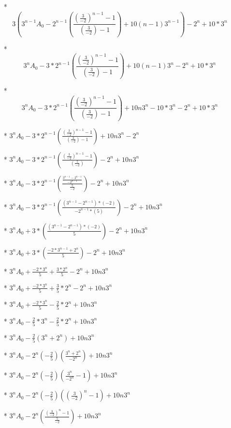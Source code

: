 \documentclass{article}
\begin{document}
\begin{enumerate}
\begin{enumerate}
\begin{itemize}
\begin{itemize}
      \item [*] $$3\left(3^{n-1}A_{0}-2^{n-1}\left(\frac{\left(\frac{3}{-2}\right)^{n-1}-1}{\left(\frac{3}{-2}\right)-1}\right)+10(n-1)3^{n-1}\right)-2^{n}+10*3^{n}$$
      \item [*] $$3^{n}A_{0}-3*2^{n-1}\left(\frac{\left(\frac{3}{-2}\right)^{n-1}-1}{\left(\frac{3}{-2}\right)-1}\right)+10(n-1)3^{n}-2^{n}+10*3^{n}$$
      \item [*] $$3^{n}A_{0}-3*2^{n-1}\left(\frac{\left(\frac{3}{-2}\right)^{n-1}-1}{\left(\frac{3}{-2}\right)-1}\right)+10n3^{n}-10*3^{n}-2^{n}+10*3^{n}$$
      \item [*] $3^{n}A_{0}-3*2^{n-1}\left(\frac{\left(\frac{3}{-2}\right)^{n-1}-1}{\left(\frac{3}{-2}\right)-1}\right)+10n3^{n}-2^{n}$
      \item [*] $3^{n}A_{0} -3*2^{n-1}\left(\frac{(\frac{3}{-2})^{n-1}-1}{(\frac{5}{-2})}\right)-2^{n}+10n3^{n}$
      \item [*] $3^{n}A_{0} -3*2^{n-1}\left(\frac{\frac{3^{n-1}-2^{n-1}}{-2^{n-1} }}{\frac{5}{-2}}\right)-2^{n}+10n3^{n}$
      \item [*] $3^{n}A_{0} -3*2^{n-1}\left(\frac{(3^{n-1}-2^{n-1})*(-2)}{-2^{n-1}*(5) }\right)-2^{n}+10n3^{n}$
      \item [*] $3^{n}A_{0} +3*\left(\frac{(3^{n-1}-2^{n-1})*(-2)}{5}\right)-2^{n}+10n3^{n}$
      \item [*] $3^{n}A_{0} +3*\left(\frac{-2*3^{n-1}+2^{n}}{5}\right)-2^{n}+10n3^{n}$
      \item [*] $3^{n}A_{0} +\frac{-2*3^{n}}{5} +\frac{3*2^{n}}{5}-2^{n}+10n3^{n}$
      \item [*] $3^{n}A_{0} +\frac{-2*3^{n}}{5} +\frac{3}{5}*2^{n}-2^{n}+10n3^{n}$
      \item [*] $3^{n}A_{0} +\frac{-2*3^{n}}{5} -\frac{2}{5}*2^{n}+10n3^{n}$
      \item [*] $3^{n}A_{0} -\frac{2}{5}*3^{n} -\frac{2}{5}*2^{n}+10n3^{n}$
      \item [*] $3^{n}A_{0} -\frac{2}{5}\left(3^{n}+2^{n}\right)+10n3^{n}$
      \item [*] $3^{n}A_{0} -2^{n}(-\frac{2}{5})\left(\frac{3^{n}+2^{n}}{-2^{n}}\right)+10n3^{n}$
      \item [*] $3^{n}A_{0} -2^{n}(-\frac{2}{5})\left(\frac{3^{n}}{-2^{n}}-1\right)+10n3^{n}$
      \item [*] $3^{n}A_{0} -2^{n}(-\frac{2}{5})\left(\left(\frac{3}{-2}\right)^{n}-1\right)+10n3^{n}$
      \item [*] $3^{n}A_{0} -2^{n}\left(\frac{\left(\frac{3}{-2}\right)^{n}-1}{\frac{5}{-2}}\right)+10n3^{n}$

\end{itemize}
\end{itemize}
\end{enumerate}
\end{enumerate}
\end{document}
